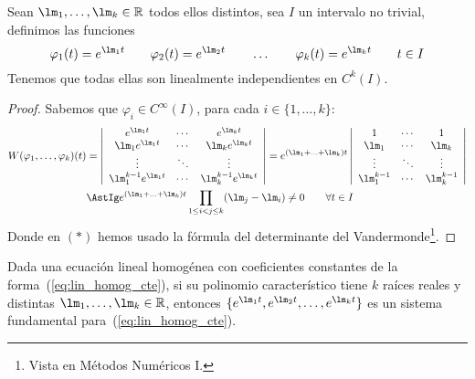\begin{observacion}
    Sean $\lm_1,\ldots,\lm_k\in \mathbb{R}$ todos ellos distintos, sea $I$ un intervalo no trivial, definimos las funciones
    \begin{equation*}
        \varphi_1(t) = e^{\lm_1 t} \qquad \varphi_2(t) = e^{\lm_2 t} \qquad \ldots \qquad \varphi_k(t) = e^{\lm_k t} \qquad t\in I
    \end{equation*}
    Tenemos que todas ellas son linealmente independientes en $C^k(I)$.
    \begin{proof}
        Sabemos que $\varphi_i \in C^\infty(I)$, para cada $i \in \{1,\ldots,k\}$:
        \begin{align*}
            W(\varphi_1,\ldots,\varphi_k)(t) &= 
            \left|\begin{array}{ccc}
                e^{\lm_1 t} & \cdots & e^{\lm_k t} \\
                \lm_1e^{\lm_1 t} & \cdots & \lm_ke^{\lm_k t} \\
                \vdots & \ddots & \vdots \\
                \lm_1^{k-1}e^{\lm_1 t} & \cdots & \lm_k^{k-1}e^{\lm_k t} 
            \end{array}\right| = e^{(\lm_1+\ldots+\lm_k)t}
            \left|\begin{array}{ccc}
                1 & \cdots & 1 \\
                \lm_1 & \cdots & \lm_k \\
                \vdots & \ddots & \vdots \\
                \lm_1^{k-1} & \cdots & \lm_k^{k-1} 
            \end{array}\right| \\
                                             &\AstIg e^{(\lm_1+\ldots+\lm_k)t} \prod_{1\leq i<j \leq k} (\lm_j-\lm_i) \neq 0 \qquad \forall t\in I
        \end{align*}
        Donde en $(\ast)$ hemos usado la fórmula del determinante del Vandermonde\footnote{Vista en Métodos Numéricos I.}.
    \end{proof}
\end{observacion}

\begin{observacion}
    Dada una ecuación lineal homogénea con coeficientes constantes de la forma~(\ref{eq:lin_homog_cte}), si su polinomio característico tiene $k$ raíces reales y distintas ${\lm_1,\ldots,\lm_k \in \mathbb{R}}$, entonces $\{e^{\lm_1 t}, e^{\lm_2 t}, \ldots, e^{\lm_k t}\}$ es un sistema fundamental para~(\ref{eq:lin_homog_cte}).
\end{observacion}


